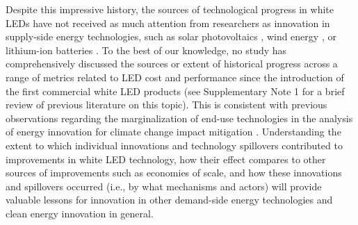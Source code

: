 \documentclass[parskip=full]{article}
\begin{document}
Despite this impressive history, the sources of technological progress in white LEDs have not received as much attention from researchers as innovation  in supply-side energy technologies, such as solar photovoltaics \cite{kavlak2018evaluating, nemet2019solar}, wind energy \cite{qiu2012price, jennings2020policy}, or lithium-ion batteries \cite{Ziegler2021, Stephan2021}. To the best of our knowledge, no study has comprehensively discussed the sources or extent of historical progress across a range of metrics related to LED cost and performance since the introduction of the first commercial white LED products (see Supplementary Note 1 for a brief review of previous literature on this topic). This is consistent with previous observations regarding the marginalization of end-use technologies in the analysis of energy innovation for climate change impact mitigation \cite{Wilson2012, Creutzig2018}. Understanding the extent to which individual innovations and technology spillovers contributed to improvements in white LED technology, how their effect compares to other sources of improvements such as economies of scale, and how these innovations and spillovers occurred (i.e., by what mechanisms and actors) will provide valuable lessons for innovation in other demand-side energy technologies and clean energy innovation in general.
\end{document}
